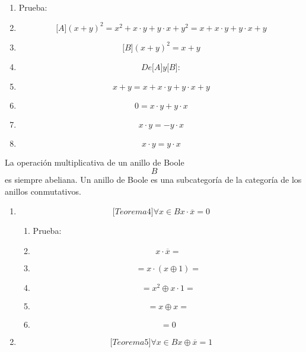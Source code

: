 \begin{enumerate}
\begin{enumerate}
\begin{enumerate}
\begin{enumerate}
        \begin{enumerate}
        \def\labelenumv{\arabic{enumv}.}
        \tightlist
        \item
          Prueba:
        \item
          \[{\lbrack A\rbrack}{{\left( {x + y} \right)^{2} = {{{x^{2} + {x \cdot y}} + {y \cdot x}} + y^{2}}} = {{{x + {x \cdot y}} + {y \cdot x}} + y}}\]
        \item
          \[{\lbrack B\rbrack}{\left( {x + y} \right)^{2} = {x + y}}\]
        \item
          \[\mathit{De}{\lbrack A\rbrack}y{\lbrack B\rbrack}:\]
        \item
          \[{x + y} = {{{x + {x \cdot y}} + {y \cdot x}} + y}\]
        \item
          \[0 = {{x \cdot y} + {y \cdot x}}\]
        \item
          \[{x \cdot y} = {{- y} \cdot x}\]
        \item
          \[{x \cdot y} = {y \cdot x}\]
        \end{enumerate}
      \end{enumerate}

      La operación multiplicativa de un anillo de Boole \[B\] es siempre
      abeliana. Un anillo de Boole es una subcategoría de la categoría
      de los anillos conmutativos.

      \begin{enumerate}
      \def\labelenumiv{\arabic{enumiv}.}
      \setcounter{enumiv}{43}
      \item
        \[{\lbrack{{Teorema}4}\rbrack}\forall{x \in B}{{x \cdot \overline{x}} = 0}\]

        \begin{enumerate}
        \def\labelenumv{\arabic{enumv}.}
        \tightlist
        \item
          Prueba:
        \item
          \[{x \cdot \overline{x}} =\]
        \item
          \[{= {x \cdot \left( {x \oplus 1} \right)}} =\]
        \item
          \[{= {x^{2} \oplus {x \cdot 1}}} =\]
        \item
          \[{= {x \oplus x}} =\]
        \item
          \[= 0\]
        \end{enumerate}
      \item
        \[{\lbrack{{Teorema}5}\rbrack}\forall{x \in B}x \oplus {\overline{x} = 1}\]


\end{enumerate}
\end{enumerate}
\end{enumerate}
\end{enumerate}
